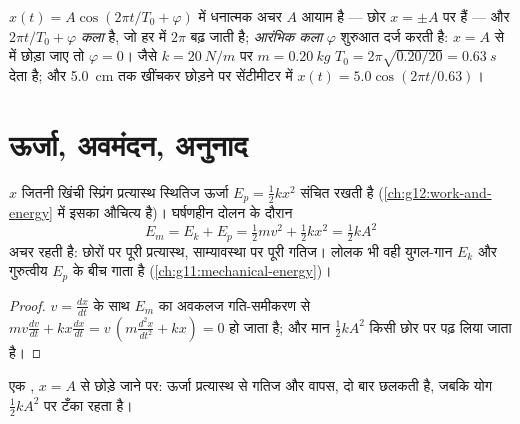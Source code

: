 \begin{definition}[आयाम और कला]\label{def:g12:oscillators-and-time:phase}
$x(t) = A\cos(2\pi t/T_0 + \varphi)$ में धनात्मक अचर $A$ आयाम है --- छोर $x = \pm A$ पर हैं --- और
$2\pi t/T_0 +
\varphi$ \emph{कला} है, जो हर  में $2\pi$ बढ़ जाती
है; \emph{आरंभिक कला} $\varphi$ शुरुआत दर्ज करती है: $x = A$ से
 में छोड़ा जाए तो $\varphi = 0$। जैसे $k = \qty{20}{N/m}$ पर $m = \qty{0.20}{kg}$ $T_0 =
2\pi\sqrt{0.20/20} = \qty{0.63}{s}$ देता है; और
\qty{5.0}{cm} तक खींचकर छोड़ने पर सेंटीमीटर में $x(t) = 5.0\cos(2\pi t/0.63)$।
\end{definition}

\section{ऊर्जा, अवमंदन, अनुनाद}

\begin{proposition}[दोलित्र की ऊर्जा]\label{prop:g12:oscillators-and-time:energy}
$x$ जितनी खिंची स्प्रिंग प्रत्यास्थ स्थितिज ऊर्जा $E_p =
\tfrac12 kx^2$ संचित
रखती है (\cref{ch:g12:work-and-energy} में इसका औचित्य है)। घर्षणहीन दोलन के दौरान 
\[
E_m = E_k + E_p = \tfrac12 m v^2 + \tfrac12 k x^2 = \tfrac12 k A^2
\]
अचर रहती है: छोरों पर पूरी प्रत्यास्थ, साम्यावस्था पर पूरी गतिज। लोलक भी वही
युगल-गान $E_k$ और गुरुत्वीय $E_p$ के बीच गाता है (\cref{ch:g11:mechanical-energy})।
\end{proposition}

\begin{proof}
$v = \frac{dx}{dt}$ के साथ $E_m$ का अवकलज गति-समीकरण से $mv\frac{dv}{dt}
+ kx\frac{dx}{dt} = v\,(m\frac{d^2x}{dt^2} + kx) = 0$ हो जाता है; और मान
$\tfrac12 kA^2$ किसी छोर पर पढ़ लिया जाता है।
\end{proof}

\begin{omfigure}

{\small एक , $x = A$ से छोड़े जाने पर: ऊर्जा
प्रत्यास्थ से गतिज और वापस, दो बार छलकती है, जबकि योग $\tfrac12 kA^2$ पर टँका रहता
है।}
\end{omfigure}

